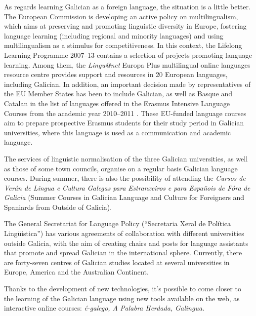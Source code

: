 \begin{multicols}{2}
As regards learning Galician as a foreign language, the situation is a little better. The European Commission is developing an active policy on multilingualism, which aims at preserving and promoting linguistic diversity in Europe, fostering language learning (including regional and minority languages) and using multilingualism as a stimulus for competitiveness. In this context, the Lifelong Learning Programme 2007--13 contains a selection of projects promoting language learning. Among them, the \textit{Lingu@net} Europa Plus multilingual online languages resource centre \cite{GAL-Nota14} provides support and resources in 20 European languages, including Galician. In addition, an important decision made by representatives of the EU Member States has been to include Galician, as well as Basque and Catalan in the list of languages offered in the Erasmus Intensive Language Courses from the academic year 2010--2011 \cite{GAL-Nota15}. These EU-funded language courses aim to prepare prospective Erasmus students for their study period in Galician universities, where this language is used as a communication and academic language.

The services of linguistic normalisation of the three Galician universities, as well as those of some town councils, organise on a regular basis Galician language courses. During summer, there is also the possibility of attending the \textit{Cursos de Verán de Lingua e Cultura Galegas para Estranxeiros e para Españois de Fóra de Galicia} (Summer Courses in Galician Language and Culture for Foreigners and Spaniards from Outside of Galicia).

The General Secretariat for Language Policy (“Secretaria Xeral de Política Lingüística”) has various agreements of collaboration with different universities outside Galicia, with the aim of creating chairs and posts for language assistants that promote and spread Galician in the international sphere. Currently, there are forty-seven centres of Galician studies located at several universities in Europe, America and the Australian Continent.


Thanks to the development of new technologies, it's possible to come closer to the learning of the Galician language using new tools available on the web, as interactive online courses:  \textit{é-galego, A Palabra Herdada, Galingua.}


\end{multicols}
